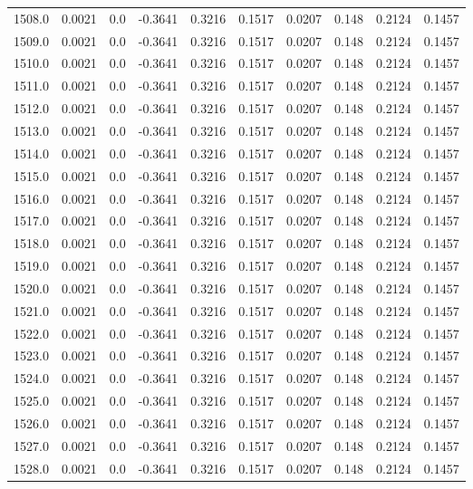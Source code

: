 \begin{longtable}{lrrrrrrrrr}
1508.0 & 0.0021 & 0.0 & -0.3641 & 0.3216 & 0.1517 & 0.0207 & 0.148 & 0.2124 & 0.1457 \\
1509.0 & 0.0021 & 0.0 & -0.3641 & 0.3216 & 0.1517 & 0.0207 & 0.148 & 0.2124 & 0.1457 \\
1510.0 & 0.0021 & 0.0 & -0.3641 & 0.3216 & 0.1517 & 0.0207 & 0.148 & 0.2124 & 0.1457 \\
1511.0 & 0.0021 & 0.0 & -0.3641 & 0.3216 & 0.1517 & 0.0207 & 0.148 & 0.2124 & 0.1457 \\
1512.0 & 0.0021 & 0.0 & -0.3641 & 0.3216 & 0.1517 & 0.0207 & 0.148 & 0.2124 & 0.1457 \\
1513.0 & 0.0021 & 0.0 & -0.3641 & 0.3216 & 0.1517 & 0.0207 & 0.148 & 0.2124 & 0.1457 \\
1514.0 & 0.0021 & 0.0 & -0.3641 & 0.3216 & 0.1517 & 0.0207 & 0.148 & 0.2124 & 0.1457 \\
1515.0 & 0.0021 & 0.0 & -0.3641 & 0.3216 & 0.1517 & 0.0207 & 0.148 & 0.2124 & 0.1457 \\
1516.0 & 0.0021 & 0.0 & -0.3641 & 0.3216 & 0.1517 & 0.0207 & 0.148 & 0.2124 & 0.1457 \\
1517.0 & 0.0021 & 0.0 & -0.3641 & 0.3216 & 0.1517 & 0.0207 & 0.148 & 0.2124 & 0.1457 \\
1518.0 & 0.0021 & 0.0 & -0.3641 & 0.3216 & 0.1517 & 0.0207 & 0.148 & 0.2124 & 0.1457 \\
1519.0 & 0.0021 & 0.0 & -0.3641 & 0.3216 & 0.1517 & 0.0207 & 0.148 & 0.2124 & 0.1457 \\
1520.0 & 0.0021 & 0.0 & -0.3641 & 0.3216 & 0.1517 & 0.0207 & 0.148 & 0.2124 & 0.1457 \\
1521.0 & 0.0021 & 0.0 & -0.3641 & 0.3216 & 0.1517 & 0.0207 & 0.148 & 0.2124 & 0.1457 \\
1522.0 & 0.0021 & 0.0 & -0.3641 & 0.3216 & 0.1517 & 0.0207 & 0.148 & 0.2124 & 0.1457 \\
1523.0 & 0.0021 & 0.0 & -0.3641 & 0.3216 & 0.1517 & 0.0207 & 0.148 & 0.2124 & 0.1457 \\
1524.0 & 0.0021 & 0.0 & -0.3641 & 0.3216 & 0.1517 & 0.0207 & 0.148 & 0.2124 & 0.1457 \\
1525.0 & 0.0021 & 0.0 & -0.3641 & 0.3216 & 0.1517 & 0.0207 & 0.148 & 0.2124 & 0.1457 \\
1526.0 & 0.0021 & 0.0 & -0.3641 & 0.3216 & 0.1517 & 0.0207 & 0.148 & 0.2124 & 0.1457 \\
1527.0 & 0.0021 & 0.0 & -0.3641 & 0.3216 & 0.1517 & 0.0207 & 0.148 & 0.2124 & 0.1457 \\
1528.0 & 0.0021 & 0.0 & -0.3641 & 0.3216 & 0.1517 & 0.0207 & 0.148 & 0.2124 & 0.1457 \\

\end{longtable}
